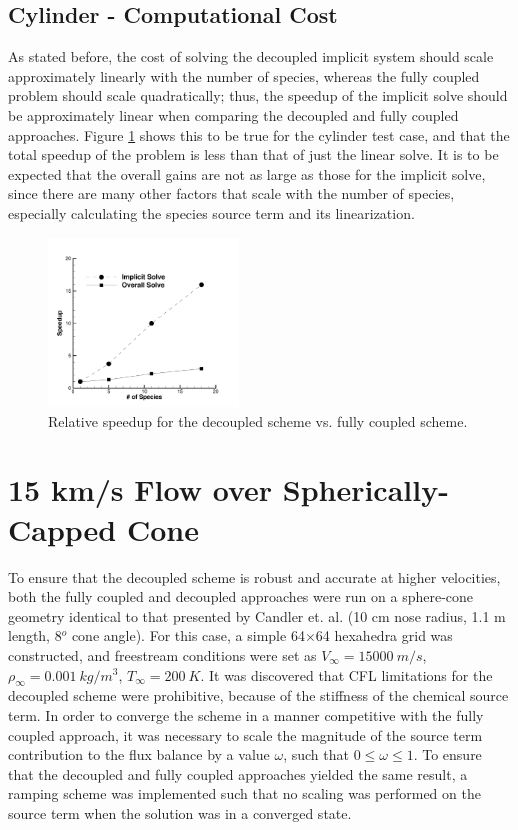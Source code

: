 \subsection{Cylinder - Computational Cost}

As stated before, the cost of solving the decoupled implicit system should scale
approximately linearly with the number of species, whereas the fully coupled
problem should scale quadratically; thus, the speedup of the implicit solve
should be approximately linear when comparing the decoupled and fully coupled
approaches.  Figure \ref{rel_speedup} shows this to be true for the cylinder test
case, and that the total speedup of the problem is less than that of just
the linear solve.  It is to be expected that the overall gains are not as large
as those for the implicit solve, since there are many other factors that
scale with the number of species, especially calculating the species source term
and its linearization.

\begin{figure}[h]
  \centering
  \includegraphics[width=0.45\textwidth]{figures/scitech/speedup} 
  \caption{ Relative speedup for the decoupled scheme vs. fully coupled scheme.}
  \label{rel_speedup} 
\end{figure}

\section{15 km/s Flow over Spherically-Capped Cone}

To ensure that the decoupled scheme is robust and accurate at higher velocities, both the
fully coupled and decoupled approaches were run on a sphere-cone geometry
identical to that presented by Candler et. al. \cite{candler} (10 cm nose
radius, 1.1 m length, 8$^o$ cone angle).  For this case, a simple 64$\times$64
hexahedra grid was constructed, and freestream conditions were set as
$V_{\infty} = 15000\ m/s$, $\rho_{\infty}=0.001\ kg/m^3$, $T_\infty = 200\ K$.
It was discovered that CFL limitations for the decoupled scheme were
prohibitive, because of the stiffness of the chemical source term.  In order to
converge the scheme in a manner competitive with the fully coupled approach, it
was necessary to scale the magnitude of the source term contribution to the flux
balance by a value $\omega$, such that $0 \leq \omega \leq 1$.  To ensure that
the decoupled and fully coupled approaches yielded the same result, a ramping
scheme was implemented such that no scaling was performed on the source term
when the solution was in a converged state.

